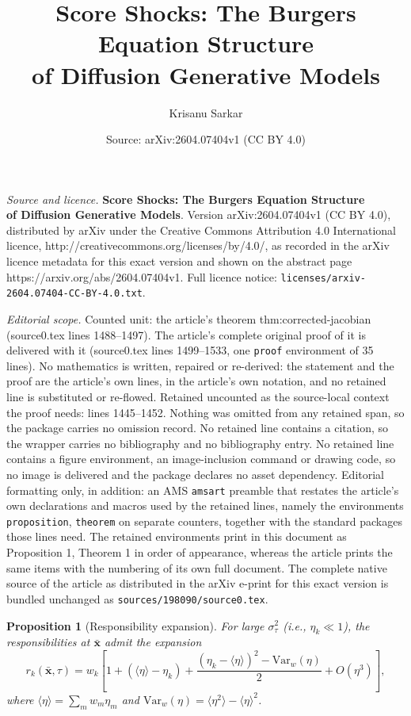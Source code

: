 \documentclass[10pt,a4paper]{amsart}
\title{\textbf{Score Shocks: The Burgers Equation Structure\\of Diffusion Generative Models}}
\author{Krisanu Sarkar}
\date{Source: arXiv:2604.07404v1 (CC BY 4.0)}
\newtheorem{proposition}{Proposition}
\newcommand{\Var}{\mathrm{Var}}
\begin{document}
\maketitle

\noindent\emph{Source and licence.} \textbf{Score Shocks: The Burgers Equation Structure\\of Diffusion Generative Models}. Version arXiv:2604.07404v1 (CC BY 4.0), distributed by arXiv under the Creative Commons Attribution 4.0 International licence, http://creativecommons.org/licenses/by/4.0/, as recorded in the arXiv licence metadata for this exact version and shown on the abstract page https://arxiv.org/abs/2604.07404v1. Full licence notice: \texttt{licenses/arxiv-2604.07404-CC-BY-4.0.txt}.\par\smallskip

\noindent\textit{Editorial scope.} Counted unit: the article's theorem thm:corrected-jacobian (source0.tex lines 1488--1497). The article's complete original proof of it is delivered with it (source0.tex lines 1499--1533, one \texttt{proof} environment of 35 lines). No mathematics is written, repaired or re-derived: the statement and the proof are the article's own lines, in the article's own notation, and no retained line is substituted or re-flowed.  Retained uncounted as the source-local context the proof needs: lines 1445--1452.  Nothing was omitted from any retained span, so the package carries no omission record.  No retained line contains a citation, so the wrapper carries no bibliography and no bibliography entry.  No retained line contains a figure environment, an image-inclusion command or drawing code, so no image is delivered and the package declares no asset dependency.  Editorial formatting only, in addition: an AMS \texttt{amsart} preamble that restates the article's own declarations and macros used by the retained lines, namely the environments \texttt{proposition}, \texttt{theorem} on separate counters, together with the standard packages those lines need.  The retained environments print in this document as Proposition 1, Theorem 1 in order of appearance, whereas the article prints the same items with the numbering of its own full document.  The complete native source of the article as distributed in the arXiv e-print for this exact version is bundled unchanged as \texttt{sources/198090/source0.tex}.
\begin{proposition}[Responsibility expansion]\label{prop:rk-expansion}
For large $\sigma_\tau^2$ (i.e., $\eta_k \ll 1$), the responsibilities at $\bar{\bm{x}}$ admit the expansion
\begin{equation}\label{eq:rk-expansion}
  r_k(\bar{\bm{x}},\tau)
  = w_k\!\left[1 + (\langle\eta\rangle - \eta_k) + \frac{(\eta_k - \langle\eta\rangle)^2 - \Var_w(\eta)}{2} + O(\eta^3)\right],
\end{equation}
where $\langle\eta\rangle = \sum_m w_m \eta_m$ and $\Var_w(\eta) = \langle\eta^2\rangle - \langle\eta\rangle^2$.
\end{proposition}
\end{document}
